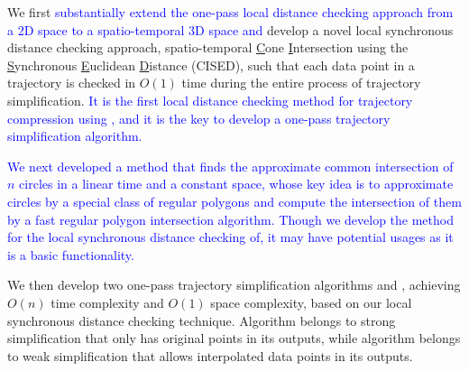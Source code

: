  We first \textcolor{blue}{substantially extend the one-pass local distance checking approach from a 2D space to a spatio-temporal 3D space and} develop a novel local synchronous distance checking approach, \ie spatio-temporal \underline{C}one \underline{I}ntersection using the \underline{S}ynchronous \underline{E}uclidean \underline{D}istance (CISED), such that each data point in a trajectory is checked in $O(1)$ time during the entire process of trajectory simplification.
\textcolor{blue}{It is the first local distance checking method for trajectory compression using \sed, and it is the key to develop a one-pass trajectory simplification algorithm.}



 \textcolor{blue}{We next developed a method that finds the approximate common intersection of $n$ circles in a linear time and a constant space, whose key idea is to approximate circles by a special class of regular polygons and compute the intersection of them by a fast regular polygon intersection algorithm. Though we develop the method for the local synchronous distance checking of, it may have potential usages as it is a basic functionality.}



 We then develop two one-pass trajectory simplification algorithms \cist and \cista, achieving $O(n)$ time complexity and $O(1)$ space complexity, based on our local synchronous distance checking technique.
Algorithm \cist belongs to strong simplification that only has original points in its outputs, while algorithm \cista belongs to weak simplification that allows interpolated data points in its outputs.



